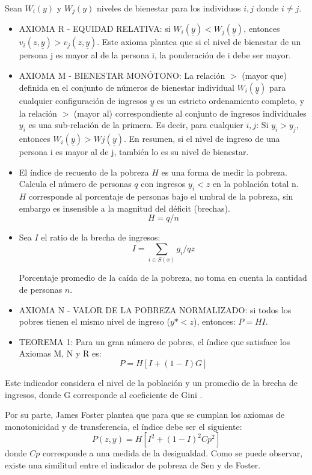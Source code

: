 \documentclass[12pt,letterpaper,spanish]{article}
\begin{document}
Sean $W_{i}(y)$ y $W_{j}(y)$ niveles de bienestar para los individuos $i,j$ donde $i\neq j$.
\begin{itemize}
\item AXIOMA R - EQUIDAD RELATIVA: si $W_{i}(\underline{y})< W_{j}(\underline{y})$, entonces $v_{i}(z,\underline{y})> v_{j}(z,\underline{y})$.
Este axioma plantea que si el nivel de bienestar de un persona j es mayor al de la persona i, la ponderación de i debe ser mayor. 

\item AXIOMA M - BIENESTAR MONÓTONO: La relación $>$ (mayor que) definida en el conjunto de números de bienestar individual $W_{i}(\underline{y})$ para cualquier configuración de ingresos $\underline{y}$ es un estricto ordenamiento completo, y la relación $>$ (mayor al) correspondiente al conjunto de ingresos individuales $y_{i}$ es una sub-relación de la primera. Es decir, para cualquier $i, j$: Si $y_{i}>y_{j}$, entonces $W_{i}(\underline{y})>Wj(\underline{y})$. En resumen, si el nivel de ingreso de una persona i es mayor al de j, también lo es su nivel de bienestar.

\item El índice de recuento de la pobreza $H$ es una forma de medir la pobreza. Calcula el número de personas $q$ con ingresos $y_{i}<z$ en la población total n. $H$ corresponde al porcentaje de personas bajo el umbral de la pobreza, sin embargo es insensible a la magnitud del déficit (brechas).
\[H=q/n\]

\item Sea $I$ el ratio de la brecha de ingresos:
\[I = \sum_{i\in S(x)} g_{i}/qz\]

Porcentaje promedio de la caída de la pobreza, no toma en cuenta la cantidad de personas $n$.
\item AXIOMA N - VALOR DE LA  POBREZA NORMALIZADO: si todos los pobres tienen el mismo nivel de ingreso ($y*<z$), entonces: $P=HI$.
\item TEOREMA 1: Para un gran número de pobres, el índice que satisface los Axiomas M, N y R es:
\[P= H[{I + (1-I)G}]\]
\end{itemize}
Este indicador considera el nivel de la población y un promedio de la brecha de ingresos, donde G corresponde al coeficiente de Gini \cite{Sen1976Poverty:Measurement}.

Por su parte, James Foster plantea que para que se cumplan los axiomas de monotonicidad y de transferencia, el índice debe ser el siguiente:
\[P(z,y)= H[{I^{2} + (1-I)^{2}Cp^{2}}]\]
donde $Cp$ corresponde a una medida de la desigualdad. Como se puede observar, existe una similitud entre el indicador de pobreza de Sen y de Foster.
\end{document}
